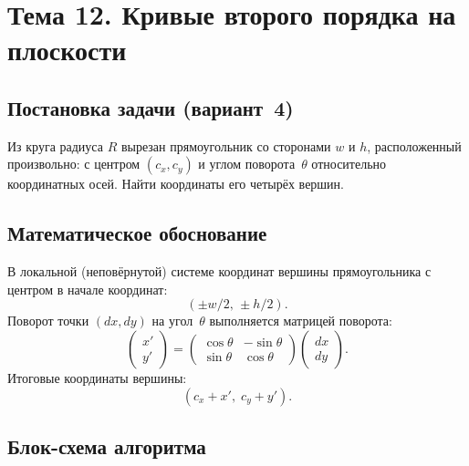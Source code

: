 \section{Тема 12. Кривые второго порядка на плоскости}

\subsection{Постановка задачи (вариант~4)}

Из круга радиуса $R$ вырезан прямоугольник со сторонами $w$ и $h$,
расположенный произвольно: с центром $(c_x,c_y)$ и углом
поворота~$\theta$ относительно координатных осей.
Найти координаты его четырёх вершин.

\subsection{Математическое обоснование}

В локальной (неповёрнутой) системе координат вершины прямоугольника
с центром в начале координат:
\[
  (\pm w/2,\,\pm h/2).
\]
Поворот точки $(dx,dy)$ на угол~$\theta$ выполняется матрицей
поворота:
\[
  \begin{pmatrix}x'\\y'\end{pmatrix} =
  \begin{pmatrix}\cos\theta & -\sin\theta\\ \sin\theta & \cos\theta\end{pmatrix}
  \begin{pmatrix}dx\\dy\end{pmatrix}.
\]
Итоговые координаты вершины:
\[
  (c_x + x',\; c_y + y').
\]

\subsection{Блок-схема алгоритма}

